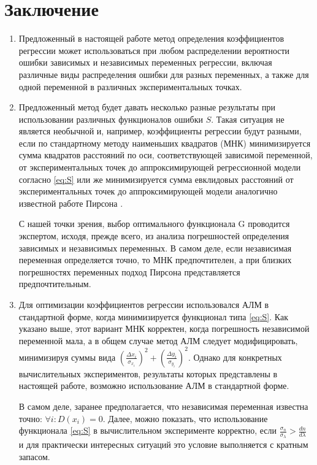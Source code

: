 \documentclass[11pt,a4paper]{article}
\theoremstyle{definition}
\begin{document}
\section{Заключение}

\begin{enumerate}
  \item Предложенный в настоящей работе метод определения коэффициентов
    регрессии может использоваться при любом распределении
    вероятности ошибки зависимых и независимых переменных регрессии,
    включая различные виды распределения ошибки для разных переменных, а
    также для одной переменной в различных экспериментальных точках.
  \item Предложенный метод будет давать несколько разные результаты при
    использовании различных функционалов ошибки $S$. Такая ситуация
    не является необычной и, например, коэффициенты регрессии будут разными,
    если по стандартному методу наименьших квадратов (МНК) минимизируется
    сумма квадратов расстояний по оси, соответствующей зависимой переменной, от экспериментальных точек до
	аппроксимирующей регрессионной модели согласно \eqref{eq:S} или же минимизируется сумма
    евклидовых расстояний от экспериментальных точек до аппроксимирующей
	модели аналогично известной работе Пирсона \cite{pearson1901}.

	С нашей точки зрения, выбор оптимального функционала G
	проводится экспертом, исходя, прежде всего, из анализа погрешностей
	определения зависимых и независимых переменных. В самом деле, если
	независимая переменная определяется точно, то МНК предпочтителен, а при
	близких погрешностях переменных подход Пирсона представляется
	предпочтительным.
  \item Для оптимизации коэффициентов регрессии использовался
	АЛМ в стандартной форме, когда минимизируется функционал типа \eqref{eq:S}. Как
	указано выше, этот вариант МНК корректен, когда погрешность независимой
	переменной мала, а в общем случае метод АЛМ следует модифицировать,
	минимизируя суммы вида $(\frac{\Delta x_i}{\sigma_{x_i}})^2 + (\frac{\Delta y_i}{\sigma_{y_i}})^2$. Однако для конкретных
	вычислительных экспериментов, результаты которых представлены в
	настоящей работе, возможно использование АЛМ в стандартной форме.

	В самом деле, заранее предполагается, что независимая
	переменная известна точно: $\forall i : D(x_i) = 0$. Далее, можно показать, что
	использование функционала \eqref{eq:S} в вычислительном эксперименте
	корректно, если $\frac{\sigma_n}{\sigma_{\lambda}} > \frac{dn}{d\lambda}$ и для практически интересных ситуаций это
	условие выполняется с кратным запасом.
\end{enumerate}
\end{document}
